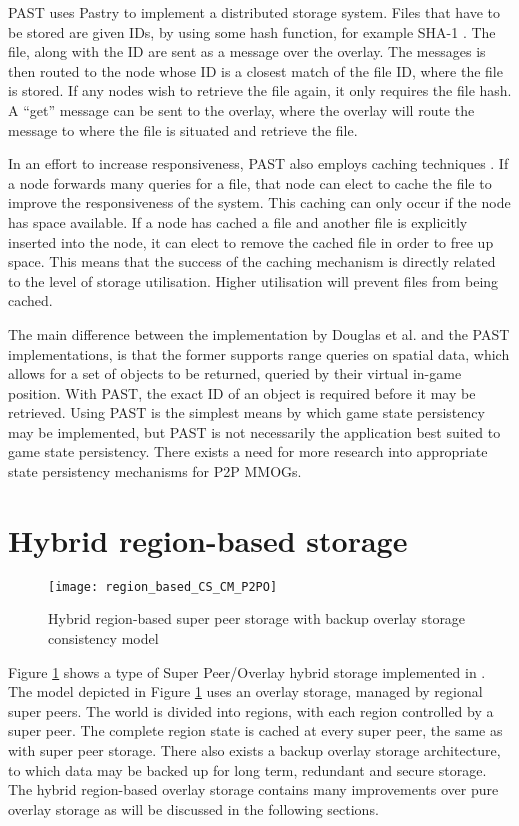PAST \cite{PAST_storage} uses Pastry to implement a distributed storage system. Files that have to be stored are given IDs, by using some hash
function, for example SHA-1 \cite{SHA}. The file, along with the ID are sent as a message over the overlay. The messages is then routed to the node
whose ID is a closest match of the file ID, where the file is stored. If any nodes wish to retrieve the file again, it only requires the file hash. A
``get'' message can be sent to the overlay, where the overlay will route the message to where the file is situated and retrieve the file.

In an effort to increase responsiveness, PAST also employs caching techniques \cite{storage_and_chaching_PAST}. If a node forwards many queries for a
file, that node can elect to cache the file to improve the responsiveness of the system. This caching can only occur if the node has space available.
If a node has cached a file and another file is explicitly inserted into the node, it can elect to remove the cached file in order to free up space.
This means that the success of the caching mechanism is directly related to the level of storage utilisation. Higher utilisation will prevent files
from being cached.

The main difference between the implementation by Douglas et al. and the PAST implementations, is that the former supports range queries on spatial
data, which allows for a set of objects to be returned, queried by their virtual in-game position. With PAST, the exact ID of an object is required
before it may be retrieved. Using PAST is the simplest means by which game state persistency may be implemented, but PAST is not necessarily the
application best suited to game state persistency. There exists a need for more research into appropriate state persistency mechanisms for P2P MMOGs.

\section{Hybrid region-based storage}
\label{hybrid_storage}

\begin{figure}[htbp]
 \centering
 \texttt{[image: region\_based\_CS\_CM\_P2PO]}
 \caption{Hybrid region-based super peer storage with backup overlay storage consistency model}
 \label{fig_cs_region_o_cm}
\end{figure}
%
Figure \ref{fig_cs_region_o_cm} shows a type of Super Peer/Overlay hybrid storage implemented in \cite{zoned_federation}. The model depicted in
Figure \ref{fig_cs_region_o_cm} uses an overlay storage, managed by regional super peers. The world is divided into regions, with each region
controlled by a super peer. The complete region state is cached at every super peer, the same as with super peer storage. There also exists a backup
overlay storage architecture, to which data may be backed up for long term, redundant and secure storage. The hybrid region-based overlay storage
contains many improvements over pure overlay storage as will be discussed in the following sections.


